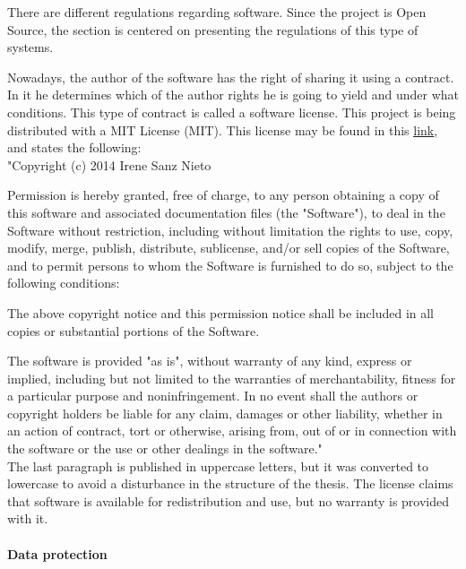	There are different regulations regarding software. 
	Since the project is Open Source, the section is centered on presenting the regulations of this type of systems. 

	Nowadays, the author of the software has the right of sharing it using a contract. 
	In it he determines which of the author rights he is going to yield and under what conditions. 
	This type of contract is called a software license. 
	This project is being distributed with a MIT License (MIT). 
	This license may be found in this  \href{https://raw.githubusercontent.com/irenesanznieto/ocular/master/LICENSE.md}{\color{blue}\underline {link}}, and states the following: \\

	"Copyright (c) 2014 Irene Sanz Nieto

Permission is hereby granted, free of charge, to any person obtaining a copy of this software and associated documentation files (the "Software"), to deal in the Software without restriction, including without limitation the rights to use, copy, modify, merge, publish, distribute, sublicense, and/or sell copies of the Software, and to permit persons to whom the Software is furnished to do so, subject to the following conditions:

The above copyright notice and this permission notice shall be included in all copies or substantial portions of the Software.

The software is provided "as is", without warranty of any kind, express or implied, including but not limited to the warranties of merchantability, fitness for a particular purpose and noninfringement. In no event shall the authors or copyright holders be liable for any claim, damages or other liability, whether in an action of contract, tort or otherwise, arising from, out of or in connection with the software or the use or other dealings in the software."
\\

	The last paragraph is published in uppercase letters, but it was converted to lowercase to avoid a disturbance in the structure of the thesis. 	
	The license claims that software is available for redistribution and use, but no warranty is provided with it. 


	\paragraph{Data protection} \mbox{}
	\\

